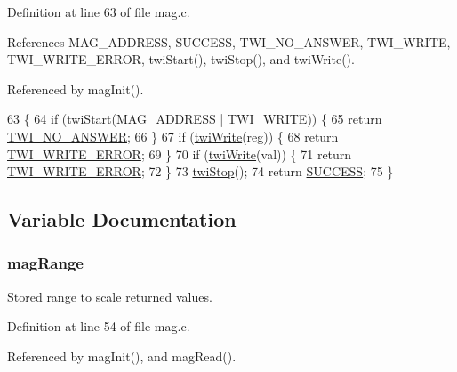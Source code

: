 Definition at line 63 of file mag.\-c.



References M\-A\-G\-\_\-\-A\-D\-D\-R\-E\-S\-S, S\-U\-C\-C\-E\-S\-S, T\-W\-I\-\_\-\-N\-O\-\_\-\-A\-N\-S\-W\-E\-R, T\-W\-I\-\_\-\-W\-R\-I\-T\-E, T\-W\-I\-\_\-\-W\-R\-I\-T\-E\-\_\-\-E\-R\-R\-O\-R, twi\-Start(), twi\-Stop(), and twi\-Write().



Referenced by mag\-Init().


\begin{DoxyCode}
63                                                  \{
64     \textcolor{keywordflow}{if} (\hyperlink{group__twi_ga4f86edc73f37ce976ea2225519ab31cd}{twiStart}(\hyperlink{group__config_gade4e63fac819c67040e374f08d2d7230}{MAG\_ADDRESS} | \hyperlink{group__twi_ga3b68e8e777b71520f9dbfac733774d5f}{TWI\_WRITE})) \{
65         \textcolor{keywordflow}{return} \hyperlink{group__error_gga2c3e4bb40f36b262a5214e2da2bca9c5a04d5943ba652af2205c88b247e0c659c}{TWI\_NO\_ANSWER};
66     \}
67     \textcolor{keywordflow}{if} (\hyperlink{group__twi_gaf42e50aaf4a9794d3a2c000e7b407887}{twiWrite}(reg)) \{
68         \textcolor{keywordflow}{return} \hyperlink{group__error_gga2c3e4bb40f36b262a5214e2da2bca9c5ac0e3b3463dcaf220e54794b4711708c9}{TWI\_WRITE\_ERROR};
69     \}
70     \textcolor{keywordflow}{if} (\hyperlink{group__twi_gaf42e50aaf4a9794d3a2c000e7b407887}{twiWrite}(val)) \{
71         \textcolor{keywordflow}{return} \hyperlink{group__error_gga2c3e4bb40f36b262a5214e2da2bca9c5ac0e3b3463dcaf220e54794b4711708c9}{TWI\_WRITE\_ERROR};
72     \}
73     \hyperlink{group__twi_gabf581270e9537a60e2d8cf3d2c1543d1}{twiStop}();
74     \textcolor{keywordflow}{return} \hyperlink{group__error_gga2c3e4bb40f36b262a5214e2da2bca9c5ac7f69f7c9e5aea9b8f54cf02870e2bf8}{SUCCESS};
75 \}
\end{DoxyCode}


\subsection{Variable Documentation}
\hypertarget{group__mag_gaae12e12b371d0bcebe05462384a519a2}{
\subsubsection[{mag\-Range}]{ mag\-Range}}\label{group__mag_gaae12e12b371d0bcebe05462384a519a2}


Stored range to scale returned values. 



Definition at line 54 of file mag.\-c.



Referenced by mag\-Init(), and mag\-Read().

